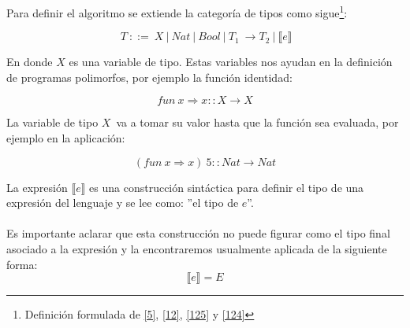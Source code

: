     \begin{definition}
        Para definir el algoritmo se extiende la categoría de tipos como sigue\footnote{Definición formulada de \hyperlink{5}{[5]},  \hyperlink{12}{[12]}, \hyperlink{125}{[125]} y \hyperlink{124}{[124]}}:
        
        $$\ T\ ::=\ X\ |\ Nat\ |\ Bool\ |\ T_1\ \to T_2\ |\ \llbracket e \rrbracket$$
        
        En donde $X$ es una variable de tipo. Estas variables nos ayudan en la definición de programas polimorfos, por ejemplo la función identidad:
        
        $$fun\ x\Rightarrow x :: X \to X$$ 
        
        La variable de tipo $X$$\,$ va a tomar su valor hasta que la función sea evaluada, por ejemplo en la aplicación:
       
        $$(fun \ x \Rightarrow x)\ 5 :: Nat \to Nat$$

        La expresión $\llbracket e \rrbracket$ es una construcción sintáctica para definir el tipo de una expresión del lenguaje y se lee como: ''el tipo de $e$''.\\\\
        Es importante aclarar que esta construcción no puede figurar como el tipo final asociado a la expresión y la encontraremos usualmente aplicada de la siguiente forma: $$\llbracket e \rrbracket = E $$
            
    \end{definition}

   \bigskip    


